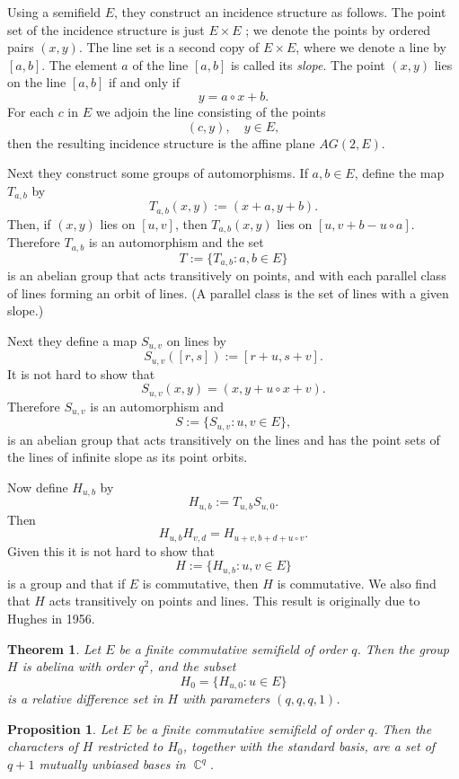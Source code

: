 \documentclass[a4paper]{article}
\DeclareMathOperator{\C}{\mathbb{C}}
\newtheorem{theorem}{Theorem}
\newtheorem{proposition}{Proposition}
\begin{document}
  Using a semifield $E$, they construct an incidence
  structure as follows. The point set of the incidence
  structure is just $E \times E$ ; we denote the points by
  ordered pairs $(x,y)$. The line set is a second copy of $E
  \times E$, where we denote a line by $[a,b]$. The element
  $a$ of the line $[a,b]$ is called its \textit{slope}. The
  point $(x,y)$ lies on the line $[a,b]$ if and only if
  \[
    y = a \circ x + b.
  \] 
  For each $c$ in $E$ we adjoin the line consisting of the
  points
  \[
    (c,y), \quad y \in E,
  \] 
  then the resulting incidence structure is the affine plane
  $AG(2,E)$.

  Next they construct some groups of automorphisms. If $a,b
  \in E$, define the map $T_{a,b}$ by
  \[
    T_{a,b}(x,y)
    := (x+a,y+b).
  \] 
  Then, if $(x,y)$ lies on $[u,v]$, then $T_{a,b}(x,y)$ lies
  on $[u,v+b-u \circ a]$. Therefore $T_{a,b}$ is an
  automorphism and the set
  \[
    T := \{T_{a,b} : a,b \in E\}
  \] 
  is an abelian group that acts transitively on points, and
  with each parallel class of lines forming an orbit of
  lines. (A parallel class is the set of lines with a given
  slope.)

  Next they define a map $S_{u,v}$ on lines by
  \[
    S_{u,v}([r,s]) := [r+u,s+v].
  \] 
  It is not hard to show that
  \[
    S_{u,v}(x,y) = (x,y+u\circ x+v).
  \]
  Therefore $S_{u,v}$ is an automorphism and
  \[
    S := \{S_{u,v} : u,v \in E\},
  \] 
  is an abelian group that acts transitively on the lines
  and has the point sets of the lines of infinite slope as
  its point orbits.

  Now define $H_{u,b}$ by
  \[
    H_{u,b} := T_{u,b} S_{u,0}.
  \] 
  Then
  \[
    H_{u,b} H_{v,d} = H_{u+v,b+d+u\circ v}.
  \] 
  Given this it is not hard to show that
  \[
    H := \{H_{u,b} : u,v \in E\}
  \] 
  is a group and that if $E$ is commutative, then $H$ is
  commutative. We also find that $H$ acts transitively on
  points and lines. This result is originally due to Hughes
  in 1956.

  \begin{theorem}
    Let $E$ be a finite commutative semifield of order $q$.
    Then the group $H$ is abelina with order $q^2$, and the
    subset
    \[
      H_0 = \{H_{u,0} : u \in E\}
    \] 
    is a relative difference set in $H$ with parameters
    $(q,q,q,1)$.
  \end{theorem}

  \begin{proposition}
    Let $E$ be a finite commutative semifield of order $q$.
    Then the characters of $H$ restricted to $H_0$, together
    with the standard basis, are a set of $q+1$ mutually
    unbiased bases in $\C^{q}$.
  \end{proposition}
\end{document}
